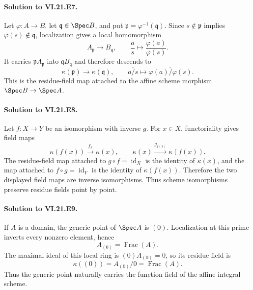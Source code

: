\paragraph{Solution to VI.21.E7.}
\begin{solution}
Let $\varphi:A\to B$, let $\mathfrak q\in\Spec B$, and put
$\mathfrak p=\varphi^{-1}(\mathfrak q)$.  Since $s\notin\mathfrak p$ implies
$\varphi(s)\notin\mathfrak q$, localization gives a local homomorphism
\[
A_{\mathfrak p}\longrightarrow B_{\mathfrak q},\qquad
\frac a s\longmapsto\frac{\varphi(a)}{\varphi(s)}.
\]
It carries $\mathfrak pA_{\mathfrak p}$ into $\mathfrak qB_{\mathfrak q}$ and therefore descends
to
\[
\kappa(\mathfrak p)\longrightarrow\kappa(\mathfrak q),\qquad
\overline{a/s}\longmapsto\overline{\varphi(a)/\varphi(s)}.
\]
This is the residue-field map attached to the affine scheme morphism $\Spec B\to\Spec A$.
\end{solution}

\paragraph{Solution to VI.21.E8.}
\begin{solution}
Let $f:X\to Y$ be an isomorphism with inverse $g$.  For $x\in X$, functoriality gives
field maps
\[
\kappa(f(x))\xrightarrow{f_x}\kappa(x),\qquad
\kappa(x)\xrightarrow{g_{f(x)}}\kappa(f(x)).
\]
The residue-field map attached to $g\circ f=\operatorname{id}_X$ is the identity of
$\kappa(x)$, and the map attached to $f\circ g=\operatorname{id}_Y$ is the identity of
$\kappa(f(x))$.  Therefore the two displayed field maps are inverse isomorphisms.  Thus scheme
isomorphisms preserve residue fields point by point.
\end{solution}

\paragraph{Solution to VI.21.E9.}
\begin{solution}
If $A$ is a domain, the generic point of $\Spec A$ is $(0)$.  Localization at this prime
inverts every nonzero element, hence
\[
A_{(0)}=\operatorname{Frac}(A).
\]
The maximal ideal of this local ring is $(0)A_{(0)}=0$, so its residue field is
\[
\kappa((0))=A_{(0)}/0=\operatorname{Frac}(A).
\]
Thus the generic point naturally carries the function field of the affine integral scheme.
\end{solution}


